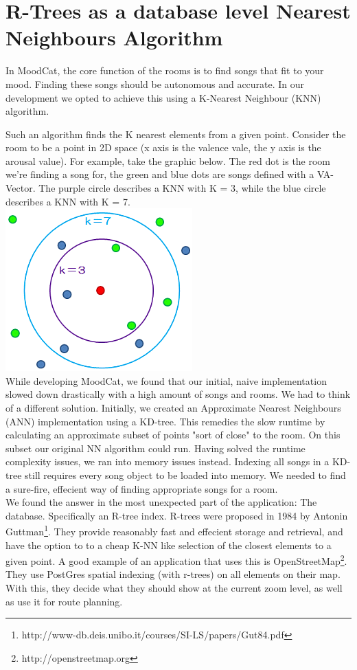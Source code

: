 \chapter{R-Trees as a database level Nearest Neighbours Algorithm}

In MoodCat, the core function of the rooms is to find songs that fit to your mood. 
Finding these songs should be autonomous and accurate. 
In our development we opted to achieve this using a K-Nearest Neighbour (KNN) algorithm.

Such an algorithm finds the K nearest elements from a given point. 
Consider the room to be a point in 2D space (x axis is the valence vale, the y axis is the arousal value). 
For example, take the graphic below. 
The red dot is the room we're finding a song for, the green and blue dots are songs defined with a VA-Vector. 
The purple circle describes a KNN with K = 3, while the blue circle describes a KNN with K = 7. \\
\includegraphics[scale=0.6]{knearestneighboursexample.png}\\

While developing MoodCat, we found that our initial, naive implementation slowed down drastically with a high amount of songs and rooms. 
We had to think of a different solution. 
Initially, we created an Approximate Nearest Neighbours (ANN) implementation using a KD-tree.
This remedies the slow runtime by calculating an approximate subset of points "sort of close" to the room.
On this subset our original NN algorithm could run.
Having solved the runtime complexity issues, we ran into memory issues instead.
Indexing all songs in a KD-tree still requires every song object to be loaded into memory.
We needed to find a sure-fire, effecient way of finding appropriate songs for a room.\\

We found the answer in the most unexpected part of the application: The database.
Specifically an R-tree index.
R-trees were proposed in 1984 by Antonin Guttman\footnote{http://www-db.deis.unibo.it/courses/SI-LS/papers/Gut84.pdf}. 
They provide reasonably fast and effecient storage and retrieval, and have the option to to a cheap K-NN like selection of the closest elements to a given point.
A good example of an application that uses this is OpenStreetMap\footnote{http://openstreetmap.org}.
They use PostGres spatial indexing (with r-trees) on all elements on their map.
With this, they decide what they should show at the current zoom level, as well as use it for route planning.

